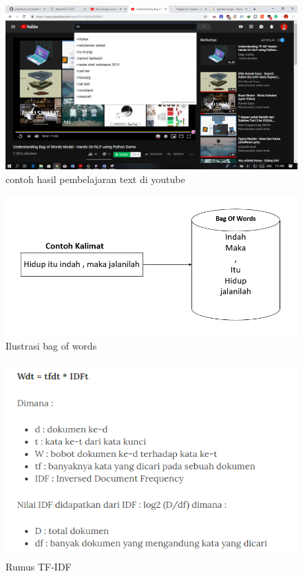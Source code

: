 \begin{figure}
      \centerline{\includegraphics[width=1\textwidth]
      {figures/cokro/c57}}
      \caption{contoh hasil pembelajaran text di youtube}
      \label{c57}
      \end{figure}

\begin{figure}
      \centerline{\includegraphics[width=1\textwidth]
      {figures/cokro/c58}}
      \caption{Ilustrasi bag of words}
      \label{c58}
      \end{figure}

\begin{figure}
      \centerline{\includegraphics[width=1\textwidth]
      {figures/cokro/c59}}
      \caption{Rumus  TF-IDF}
      \label{c59}
      \end{figure}

